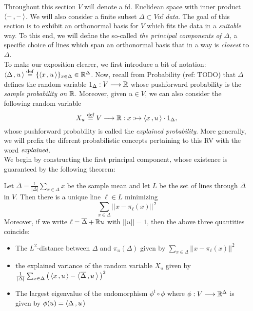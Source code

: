 \documentclass{dsp}
\begin{document}
Throughout this section $V$ will denote a fd. Euclidean space with inner product $\left\langle -\,,-\, \right\rangle$. We will also consider a finite subset $\Delta\subset V$of \emph{data}. The goal of this section is to exhibit an orthonormal basis for $V$ which fits the data in a \emph{suitable} way. To this end, we will define the so-called \emph{the principal components of $\Delta$}, a specific choice of lines which span an orthonormal basis that in a way is \emph{closest} to $\Delta$.\\
To make our exposition clearer, we first introduce a bit of notation: $\left\langle \Delta\,,u\, \right\rangle\stackrel{\operatorname{def}}{=} \{\left\langle x\,,u\, \right\rangle\}_{x\in \Delta}\in \mathbb{R}^\Delta$. Now, recall from Probability (ref: TODO) that $\Delta$ defines the random variable $1_\Delta: V\longrightarrow \mathbb{R}$ whose pushforward probability is the \emph{sample probability on $\mathbb{R}$}. Moreover, given $u \in V$, we can also consider the following random variable
\[
X_u\stackrel{\operatorname{def}}{=} V\longrightarrow \mathbb{R}: x:\mapsto \left\langle x\,,u\, \right\rangle\cdot1_\Delta,
\]
whose pushforward probability is called the \emph{explained probability}. More generally, we will prefix the diferent probabilistic concepts pertaining to this RV with the word $\emph{explained}$.\\ 
We begin by constructing the first principal component, whose existence is guaranteed by the following theorem:

\begin{theorem}
\label{theorem:principal_component}
Let $\overline{\Delta}= \frac{1}{\vert \Delta\vert}\sum_{x\in \Delta} x$ be the sample mean and let $L$ be the set of lines through $\overline{\Delta}$ in $V$. Then there is a unique line $\ell \in L$ minimizing
\[
\sum_{x \in \Delta} \vert\vert x-\pi_\ell(x) \vert\vert^2
\]
Moreover, if we write $\ell=\overline{\Delta}+\mathbb{R}u$ with $\vert \vert u\vert \vert =1$, then the above three quantities coincide:
\begin{itemize}
\item The $L^2$-distance between $\Delta$ and $\pi_u(\Delta)$ given by $\sum_{x \in \Delta} \vert\vert x-\pi_\ell(x) \vert\vert^2$
\item the explained variance of the random variable $X_u$ given by $\frac{1}{\vert \Delta \vert}\sum_{x \in \Delta} \big(\left\langle x\,,u\, \right\rangle- \left\langle \overline{\Delta}\,,u\, \right\rangle\big)^2$
\item The largest eigenvalue of the endomorphism $\phi^t\circ \phi$ where $\phi: V\longrightarrow \mathbb{R}^\Delta$ is given by $\phi(u)=\left\langle \Delta\,,u\, \right\rangle$ 
\end{itemize}
\end{theorem}
\end{document}
